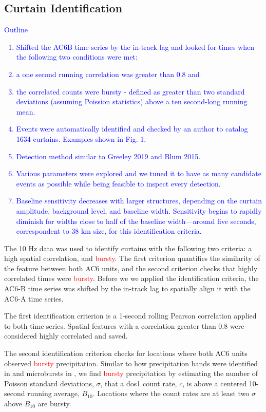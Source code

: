 \documentclass[draft]{agujournal2019}
\begin{document}
\subsection{Curtain Identification} \label{curtain_identification}
\textcolor{blue}{
Outline
\begin{enumerate}
\item Shifted the AC6B time series by the in-track lag and looked for times when the following two conditions were met:
\item a one second running correlation was greater than 0.8 and
\item the correlated counts were bursty - defined as greater than two standard deviations (assuming Poission statistics) above a ten second-long running mean.
\item Events were automatically identified and checked by an author to catalog 1634 curtains. Examples shown in Fig. 1.
\item Detection method similar to Greeley 2019 and Blum 2015.
\item Various parameters were explored and we tuned it to have as many candidate events as possible while being feasible to inspect every detection. 
\item Baseline sensitivity decreases with larger structures, depending on the curtain amplitude, background level, and baseline width. Sensitivity begins to rapidly diminish for widths close to half of the baseline width---around five seconds, correspondent to 38 km size, for this identification criteria.
\end{enumerate}
}

The 10 Hz data was used to identify curtains with the following two criteria: a high spatial correlation, and \textcolor{red}{bursty}. The first criterion quantifies the similarity of the feature between both AC6 units, and the second criterion checks that highly correlated times were \textcolor{red}{bursty}. Before we we applied the identification criteria, the AC6-B time series was shifted by the in-track lag to spatially align it with the AC6-A time series. 

The first identification criterion is a 1-second rolling Pearson correlation applied to both time series. Spatial features with a correlation greater than 0.8 were considered highly correlated and saved.

The second identification criterion checks for locations where both AC6 units observed \textcolor{red}{bursty} precipitation. Similar to how precipitation bands were identified in  and microbursts in , we find \textcolor{red}{bursty} precipitation by estimating the number of Poisson standard deviations, $\sigma$, that a dos1 count rate, $c$, is above a centered 10-second running average, $B_{10}$. Locations where the count rates are at least two $\sigma$ above $B_{10}$ are bursty. 
\end{document}
